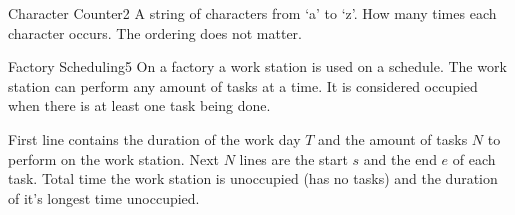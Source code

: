 \begin{task}{Character Counter}{2}
    \In
    A string of characters from `a' to `z'.
    \Out
    How many times each character occurs. The ordering does not matter.

    \begin{ExampleIO}
    \end{ExampleIO}
\end{task}

\begin{task}{Factory Scheduling}{5}
    On a factory a work station is used on a schedule. The work station
    can perform any amount of tasks at a time. It is considered occupied
    when there is at least one task being done.
 
    \In
    First line contains the duration of the work day $T$ and the amount of tasks $N$
    to perform on the work station. Next $N$ lines are the start $s$ and the end $e$
    of each task.
    \Out
    Total time the work station is unoccupied (has no tasks) and the duration of
    it's longest time unoccupied. \\

    \begin{ExampleIO}
    \end{ExampleIO}
\end{task}
